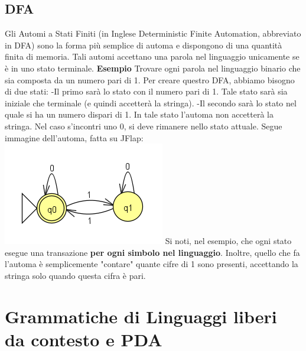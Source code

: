\documentclass[]{article}
\begin{document}
\subsection{DFA}
Gli Automi a Stati Finiti (in Inglese Deterministic Finite Automation, abbreviato in DFA) sono la forma più semplice di automa e dispongono di una quantità finita di memoria.
Tali automi accettano una parola nel linguaggio unicamente se è in uno stato terminale.
\newline
\newline
\textbf{Esempio}
Trovare ogni parola nel linguaggio binario che sia composta da un numero pari di 1.\newline
Per creare questro DFA, abbiamo bisogno di due stati:\newline
-Il primo sarà lo stato con il numero pari di 1. Tale stato sarà sia iniziale che terminale (e quindi accetterà la stringa).\newline
-Il secondo sarà lo stato nel quale si ha un numero dispari di 1. In tale stato l'automa non accetterà la stringa.\newline
Nel caso s'incontri uno 0, si deve rimanere nello stato attuale.\newline
Segue immagine dell'automa, fatta su JFlap:
\newline
\includegraphics{DFA1.png}
\newline
\newline
Si noti, nel esempio, che ogni stato esegue una transazione \textbf{per ogni simbolo nel linguaggio}. Inoltre, quello che fa l'automa è semplicemente "contare" quante cifre di 1 sono presenti, accettando la stringa solo quando questa cifra è pari.
\section{Grammatiche di Linguaggi liberi da contesto e PDA}
\end{document}
